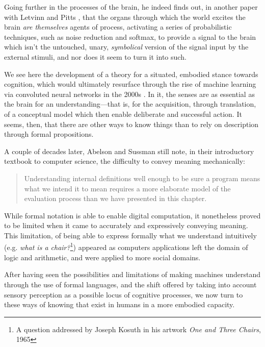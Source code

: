 Going further in the processes of the brain, he indeed finds out, in another paper with Letvinn and Pitts \citep{lettvin_what_1959}, that the organs through which the world excites the brain \emph{are themselves} agents of process, activating a series of probabilistic techniques, such as noise reduction and softmax, to provide a signal to the brain which isn't the untouched, unary, \emph{symbolical} version of the signal input by the external stimuli, and nor does it seem to turn it into such.

We see here the development of a theory for a situated, embodied stance towards cognition, which would ultimately resurface through the rise of machine learning via convoluted neural networks in the 2000s \citep{nilsson_quest_2009}. In it, the senses are as essential as the brain for an understanding—that is, for the acquisition, through translation, of a conceptual model which then enable deliberate and successful action. It seems, then, that there are other ways to know things than to rely on description through formal propositions.

A couple of decades later, Abelson and Sussman still note, in their introductory textbook to computer science, the difficulty to convey meaning mechanically:

\begin{quote}
    Understanding internal definitions well enough to be sure a program means what we intend it to mean requires a more elaborate model of the evaluation process than we have presented in this chapter. \citep{abelson_structure_1979}
\end{quote}

While formal notation is able to enable digital computation, it nonetheless proved to be limited when it came to accurately and expressively  conveying meaning. This limitation, of being able to express formally what we understand intuitively (e.g. \emph{what is a chair?}\footnote{A question addressed by Joseph Kosuth in his artwork \emph{One and Three Chairs}, 1965}) appeared as computers applications left the domain of logic and arithmetic, and were applied to more social domains.

After having seen the possibilities and limitations of making machines understand through the use of formal languages, and the shift offered by taking into account sensory perception as a possible locus of cognitive processes, we now turn to these ways of knowing that exist in humans in a more embodied capacity.


